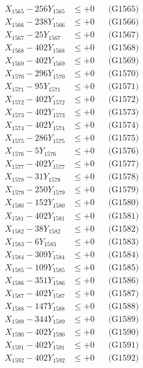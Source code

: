 \documentclass[a4paper,10pt]{article}
\begin{document}
{\begin{align}
X_{1565} - 256Y_{1565} &\leq +0 && \text{(G1565)} \\
X_{1566} - 238Y_{1566} &\leq +0 && \text{(G1566)} \\
X_{1567} - 25Y_{1567} &\leq +0 && \text{(G1567)} \\
X_{1568} - 402Y_{1568} &\leq +0 && \text{(G1568)} \\
X_{1569} - 402Y_{1569} &\leq +0 && \text{(G1569)} \\
X_{1570} - 296Y_{1570} &\leq +0 && \text{(G1570)} \\
\allowbreak
X_{1571} - 95Y_{1571} &\leq +0 && \text{(G1571)} \\
X_{1572} - 402Y_{1572} &\leq +0 && \text{(G1572)} \\
X_{1573} - 402Y_{1573} &\leq +0 && \text{(G1573)} \\
X_{1574} - 402Y_{1574} &\leq +0 && \text{(G1574)} \\
X_{1575} - 286Y_{1575} &\leq +0 && \text{(G1575)} \\
X_{1576} - 5Y_{1576} &\leq +0 && \text{(G1576)} \\
X_{1577} - 402Y_{1577} &\leq +0 && \text{(G1577)} \\
X_{1578} - 31Y_{1578} &\leq +0 && \text{(G1578)} \\
X_{1579} - 250Y_{1579} &\leq +0 && \text{(G1579)} \\
X_{1580} - 152Y_{1580} &\leq +0 && \text{(G1580)} \\
\allowbreak
X_{1581} - 402Y_{1581} &\leq +0 && \text{(G1581)} \\
X_{1582} - 38Y_{1582} &\leq +0 && \text{(G1582)} \\
X_{1583} - 6Y_{1583} &\leq +0 && \text{(G1583)} \\
X_{1584} - 309Y_{1584} &\leq +0 && \text{(G1584)} \\
X_{1585} - 109Y_{1585} &\leq +0 && \text{(G1585)} \\
X_{1586} - 351Y_{1586} &\leq +0 && \text{(G1586)} \\
X_{1587} - 402Y_{1587} &\leq +0 && \text{(G1587)} \\
X_{1588} - 147Y_{1588} &\leq +0 && \text{(G1588)} \\
X_{1589} - 344Y_{1589} &\leq +0 && \text{(G1589)} \\
X_{1590} - 402Y_{1590} &\leq +0 && \text{(G1590)} \\
\allowbreak
X_{1591} - 402Y_{1591} &\leq +0 && \text{(G1591)} \\
X_{1592} - 402Y_{1592} &\leq +0 && \text{(G1592)} \\

\end{align}}
\end{document}
